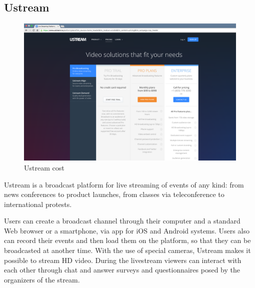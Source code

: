 \subsection{Ustream}
\label{sec:Ustream}

\begin{figure}[!htb]
 \centering
 \includegraphics[width=1.0\linewidth]{images/chapter2/ustream.png}\hfill
 \caption[Ustream cost]{Ustream cost}
 \label{fig:fourV}
\end{figure}

Ustream is a broadcast platform for live streaming of events of any kind: from news conferences to product launches, from classes via teleconference to international protests.

Users can create a broadcast channel through their computer and a standard Web browser or a smartphone, via app for iOS and Android systems.
Users also can record their events and then load them on the platform, so that they can be broadcasted at another time. With the use of special cameras, Ustream makes it possible to stream HD video.
During the livestream viewers can interact with each other through chat and answer surveys and questionnaires posed by the organizers of the stream.

  